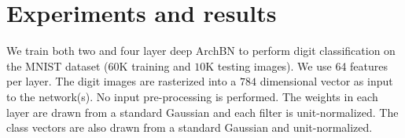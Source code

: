 \documentclass{article} %
\DeclareMathOperator*{\argmin}{argmin}
\newcommand{\changeBM}[1]{#1} %
\begin{document}
%
%
%
%






\section{Experiments and results}
\label{Experiments}
We train both two and four layer deep ArchBN to perform digit classification on the MNIST dataset ($60$K training and $10$K testing images). We use 64 features per layer. The digit images are rasterized into a $784$ dimensional vector as input to the network(s). No input pre-processing \changeBM{is} performed. The weights in each layer are drawn from a standard Gaussian and each filter is unit-normalized. The class vectors are also drawn from a standard Gaussian and unit-normalized.  

\end{document}

